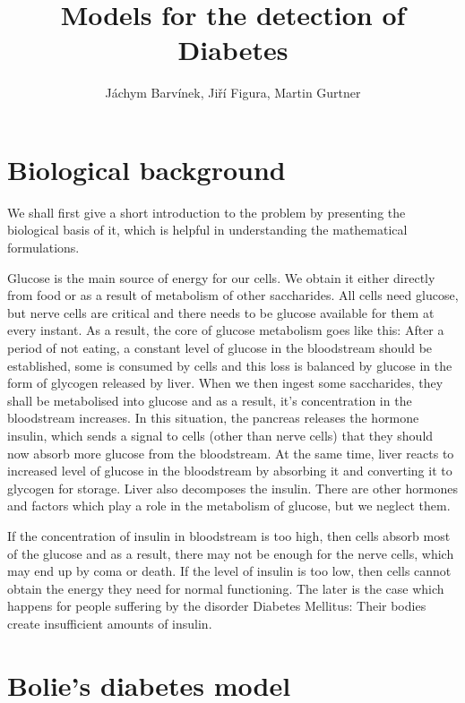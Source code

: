 \documentclass[14pt]{article}
\begin{document}
\title{Models for the detection of Diabetes}
\author{J\'achym Barv\'inek, Ji\v r\'i Figura, Martin Gurtner}

\maketitle

\section{Biological background}
We shall first give a short introduction to the problem by presenting the biological basis of it,
which is helpful in understanding the mathematical formulations. 

Glucose is the main source of energy for our cells.
We obtain it either directly from food or as a result of metabolism of other saccharides. 
All cells need glucose, but nerve cells are critical and there needs to be glucose available for 
them at every instant. As a result, the core of glucose metabolism goes like this:
After a period of not eating, a constant level of glucose in the bloodstream should be established,
some is consumed by cells and this loss is balanced by glucose in the form of glycogen
released by liver. When we then ingest some saccharides, they shall be metabolised into glucose
and as a result, it's concentration in the bloodstream increases. In this situation, the pancreas
releases the hormone insulin, which sends a signal to cells (other than nerve cells) that they should
now absorb more glucose from the bloodstream. At the same time, liver reacts to increased level of 
glucose in the bloodstream by absorbing it and converting it to glycogen for storage. Liver also 
decomposes the insulin. There are other hormones and factors which play a role in the metabolism
of glucose, but we neglect them.

If the concentration of insulin in bloodstream is too high, then cells absorb most of the glucose 
and as a result, there may not be enough for the nerve cells, which may end up by coma or death.
If the level of insulin is too low, then cells cannot obtain the energy they need for normal functioning.
The later is the case which happens for people suffering by the disorder Diabetes Mellitus: Their bodies
create insufficient amounts of insulin.


\section{Bolie's diabetes model}
\end{document}
